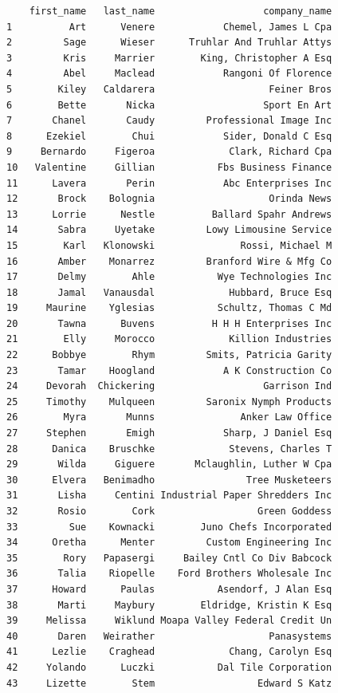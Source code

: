 \documentclass[
  12pt,
]{article}
\begin{document}
\begin{verbatim}
    first_name   last_name                   company_name
1          Art      Venere            Chemel, James L Cpa
2         Sage      Wieser      Truhlar And Truhlar Attys
3         Kris     Marrier        King, Christopher A Esq
4         Abel     Maclead            Rangoni Of Florence
5        Kiley   Caldarera                    Feiner Bros
6        Bette       Nicka                   Sport En Art
7       Chanel       Caudy         Professional Image Inc
8      Ezekiel        Chui            Sider, Donald C Esq
9     Bernardo     Figeroa             Clark, Richard Cpa
10   Valentine     Gillian           Fbs Business Finance
11      Lavera       Perin            Abc Enterprises Inc
12       Brock    Bolognia                    Orinda News
13      Lorrie      Nestle          Ballard Spahr Andrews
14       Sabra     Uyetake         Lowy Limousine Service
15        Karl   Klonowski               Rossi, Michael M
16       Amber    Monarrez         Branford Wire & Mfg Co
17       Delmy        Ahle           Wye Technologies Inc
18       Jamal   Vanausdal             Hubbard, Bruce Esq
19     Maurine    Yglesias           Schultz, Thomas C Md
20       Tawna      Buvens          H H H Enterprises Inc
21        Elly     Morocco             Killion Industries
22      Bobbye        Rhym         Smits, Patricia Garity
23       Tamar    Hoogland            A K Construction Co
24     Devorah  Chickering                   Garrison Ind
25     Timothy    Mulqueen         Saronix Nymph Products
26        Myra       Munns               Anker Law Office
27     Stephen       Emigh            Sharp, J Daniel Esq
28      Danica    Bruschke             Stevens, Charles T
29       Wilda     Giguere       Mclaughlin, Luther W Cpa
30      Elvera   Benimadho                Tree Musketeers
31       Lisha     Centini Industrial Paper Shredders Inc
32       Rosio        Cork                  Green Goddess
33         Sue    Kownacki        Juno Chefs Incorporated
34      Oretha      Menter         Custom Engineering Inc
35        Rory   Papasergi     Bailey Cntl Co Div Babcock
36       Talia    Riopelle    Ford Brothers Wholesale Inc
37      Howard      Paulas           Asendorf, J Alan Esq
38       Marti     Maybury        Eldridge, Kristin K Esq
39     Melissa     Wiklund Moapa Valley Federal Credit Un
40       Daren   Weirather                    Panasystems
41      Lezlie    Craghead             Chang, Carolyn Esq
42     Yolando      Luczki           Dal Tile Corporation
43     Lizette        Stem                  Edward S Katz

\end{verbatim}
\end{document}
